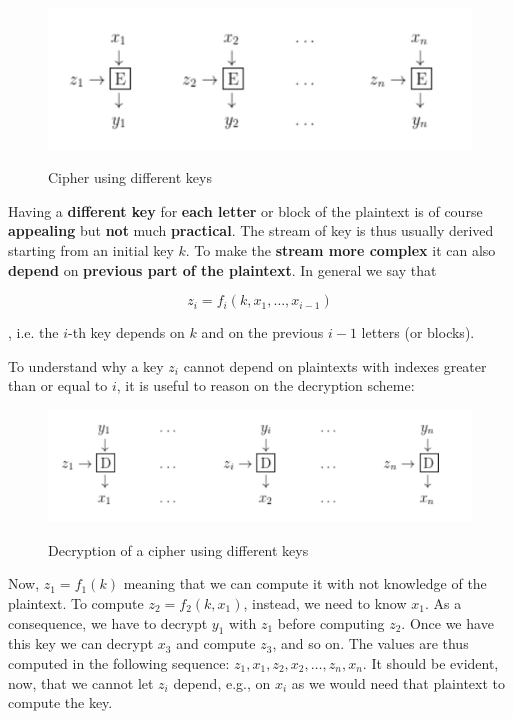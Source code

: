 \begin{figure}[h!]
        \centering
        \includegraphics[scale = 1.0]{img/stream2.png}
        \label{stream2}
        \caption{Cipher using different keys}
\end{figure}

Having a \textbf{different key} for \textbf{each letter} or block of the plaintext is of course \textbf{appealing} but \textbf{not} much \textbf{practical}. The stream of key is thus usually derived starting from an initial key $k$. To make the \textbf{stream more complex} it can also \textbf{depend} on \textbf{previous part of the plaintext}. In general we say that 

$$z_i = f_i(k,x_1,\ldots,x_{i-1})$$

, i.e. the $i$-th key depends on $k$ and on the previous $i-1$ letters (or blocks).

To understand why a key $z_i$ cannot depend on plaintexts with indexes greater than or equal to $i$, it is useful to reason on the decryption scheme:

\begin{figure}[h!]
        \centering
        \includegraphics[scale = 1.0]{img/stream3.png}
        \label{stream3}
        \caption{Decryption of a cipher using different keys}
\end{figure}

Now, $z_1 = f_1(k)$ meaning that we can compute it with not knowledge of the plaintext. To compute $z_2 = f_2(k,x_1)$, instead, we need to know $x_1$. As a consequence, we have to decrypt $y_1$ with $z_1$ before computing $z_2$. Once we have this key we can decrypt $x_3$ and compute $z_3$, and so on. The values are thus computed in the following sequence: $z_1,x_1,z_2,x_2, \ldots, z_n,x_n$. It should be evident, now, that we cannot let $z_i$ depend, e.g., on $x_i$ as we would need that plaintext to compute the key.

